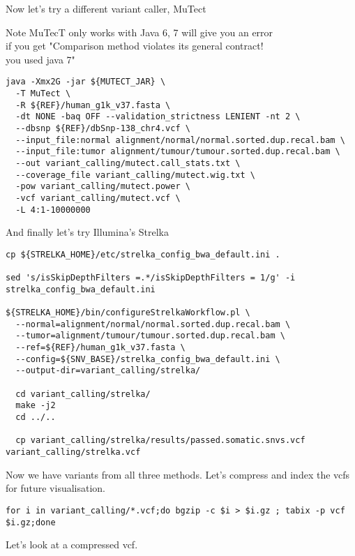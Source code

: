 Now let's try a different variant caller, MuTect \\

\begin{note} 
Note MuTecT only works with Java 6, 7 will give you an error \\
if you get "Comparison method violates its general contract! \\
you used java 7"
\end{note}

\begin{lstlisting}
java -Xmx2G -jar ${MUTECT_JAR} \
  -T MuTect \
  -R ${REF}/human_g1k_v37.fasta \
  -dt NONE -baq OFF --validation_strictness LENIENT -nt 2 \
  --dbsnp ${REF}/dbSnp-138_chr4.vcf \
  --input_file:normal alignment/normal/normal.sorted.dup.recal.bam \
  --input_file:tumor alignment/tumour/tumour.sorted.dup.recal.bam \
  --out variant_calling/mutect.call_stats.txt \
  --coverage_file variant_calling/mutect.wig.txt \
  -pow variant_calling/mutect.power \
  -vcf variant_calling/mutect.vcf \
  -L 4:1-10000000
\end{lstlisting}

And finally let's try Illumina's Strelka

\begin{lstlisting}
cp ${STRELKA_HOME}/etc/strelka_config_bwa_default.ini .

sed 's/isSkipDepthFilters =.*/isSkipDepthFilters = 1/g' -i strelka_config_bwa_default.ini

${STRELKA_HOME}/bin/configureStrelkaWorkflow.pl \
  --normal=alignment/normal/normal.sorted.dup.recal.bam \
  --tumor=alignment/tumour/tumour.sorted.dup.recal.bam \
  --ref=${REF}/human_g1k_v37.fasta \
  --config=${SNV_BASE}/strelka_config_bwa_default.ini \
  --output-dir=variant_calling/strelka/

  cd variant_calling/strelka/
  make -j2
  cd ../..

  cp variant_calling/strelka/results/passed.somatic.snvs.vcf variant_calling/strelka.vcf
\end{lstlisting}

Now we have variants from all three methods. Let's compress and index the vcfs for future visualisation.

\begin{lstlisting}
for i in variant_calling/*.vcf;do bgzip -c $i > $i.gz ; tabix -p vcf $i.gz;done
\end{lstlisting}

Let's look at a compressed vcf.


